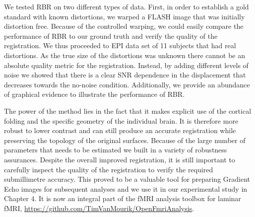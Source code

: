 We tested RBR on two different types of data. First, in order to establish a gold standard with known distortions, we warped a FLASH image that was initially distortion free. Because of the controlled warping, we could easily compare the performance of RBR to our ground truth and verify the quality of the registration. We thus proceeded to EPI data set of 11 subjects that had real distortions. As the true size of the distortions was unknown there cannot be an absolute quality metric for the registration. Instead, by adding different levels of noise we showed that there is a clear SNR dependence in the displacement that decreases towards the no-noise condition. Additionally, we provide an abundance of graphical evidence to illustrate the performance of RBR.

The power of the method lies in the fact that it makes explicit use of the cortical folding and the specific geometry of the individual brain. It is therefore more robust to lower contrast and can still produce an accurate registration while preserving the topology of the original surfaces. Because of the large number of parameters that needs to be estimated we built in a variety of robustness assurances. Despite the overall improved registration, it is still important to carefully inspect the quality of the registration to verify the required submillimetre accuracy. This proved to be a valuable tool for preparing Gradient Echo images for subsequent analyses and we use it in our experimental study in Chapter 4. It is now an integral part of the fMRI analysis toolbox for laminar fMRI, \url{https://github.com/TimVanMourik/OpenFmriAnalysis}.

